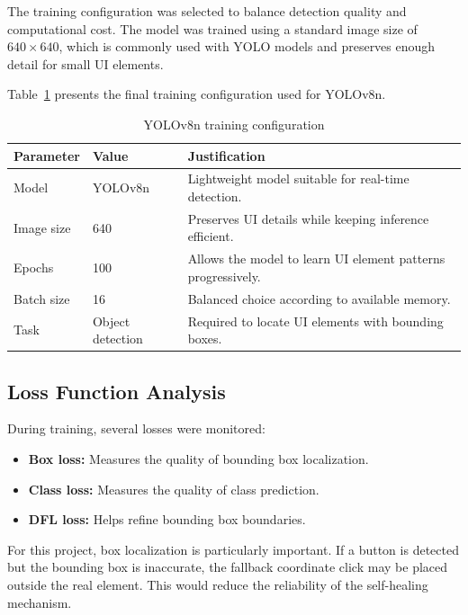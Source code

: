The training configuration was selected to balance detection quality and computational cost. The model was trained using a standard image size of $640 \times 640$, which is commonly used with YOLO models and preserves enough detail for small UI elements.

Table~\ref{tab:yolo_training_config} presents the final training configuration used for YOLOv8n.

\begin{table}[H]
	\centering
	\caption{YOLOv8n training configuration}
	\label{tab:yolo_training_config}
	\renewcommand{\arraystretch}{1.35}
	\small
	\begin{tabularx}{\textwidth}{|l|l|X|}
		\hline
		\rowcolor{gray!20}
		\textbf{Parameter} & \textbf{Value} & \textbf{Justification} \\ \hline
		Model & YOLOv8n & Lightweight model suitable for real-time detection. \\ \hline
		Image size & 640 & Preserves UI details while keeping inference efficient. \\ \hline
		Epochs & 100 & Allows the model to learn UI element patterns progressively. \\ \hline
		Batch size & 16 & Balanced choice according to available memory. \\ \hline
		Task & Object detection & Required to locate UI elements with bounding boxes. \\ \hline
	\end{tabularx}
\end{table}

\subsection{Loss Function Analysis}
\label{subsec:loss_analysis}

During training, several losses were monitored:

\begin{itemize}
	\item \textbf{Box loss:} Measures the quality of bounding box localization.
	\item \textbf{Class loss:} Measures the quality of class prediction.
	\item \textbf{DFL loss:} Helps refine bounding box boundaries.
\end{itemize}

For this project, box localization is particularly important. If a button is detected but the bounding box is inaccurate, the fallback coordinate click may be placed outside the real element. This would reduce the reliability of the self-healing mechanism.

